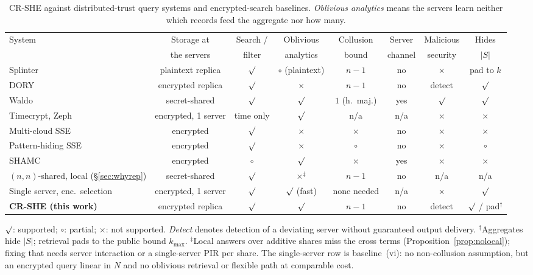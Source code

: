 \documentclass[a4paper,fleqn]{cas-dc}
\providecommand{\checkmark}{\ensuremath{\surd}}
\begin{document}
\begin{table}[pos=t,width=\textwidth]
\caption{CR-SHE against distributed-trust query systems and encrypted-search
baselines. \emph{Oblivious analytics} means the servers learn neither which
records feed the aggregate nor how many.}
\label{tab:compare}
\centering
\scriptsize
\setlength{\tabcolsep}{3pt}
\begin{tabular*}{\tblwidth}{@{\extracolsep{\fill}}lccccccc@{}}
\toprule
System & Storage at & Search / & Oblivious & Collusion & Server & Malicious &
Hides \\
 & the servers & filter & analytics & bound & channel & security & $|S|$ \\
\midrule
Splinter \citep{splinter} & plaintext replica & $\checkmark$ &
$\circ$ (plaintext) & $n-1$ & no & $\times$ & pad to $k$ \\
DORY \citep{dory} & encrypted replica & $\checkmark$ & $\times$ & $n-1$ & no &
detect & $\checkmark$ \\
Waldo \citep{waldo} & secret-shared & $\checkmark$ & $\checkmark$ &
$1$ (h.\ maj.) & yes & $\checkmark$ & $\checkmark$ \\
Timecrypt, Zeph \citep{timecrypt,zeph} & encrypted, 1 server & time only &
$\checkmark$ & n/a & n/a & $\times$ & $\times$ \\
Multi-cloud SSE \citep{xu2021privacy} & encrypted & $\checkmark$ & $\times$ &
$\times$ & no & $\times$ & $\times$ \\
Pattern-hiding SSE \citep{xu2023symmetric} & encrypted & $\checkmark$ &
$\times$ & $\circ$ & no & $\times$ & $\circ$ \\
SHAMC \citep{wang2020shamc} & encrypted & $\circ$ & $\checkmark$ & $\times$ &
yes & $\times$ & $\times$ \\
\midrule
$(n,n)$-shared, local (\S\ref{sec:whyrep}) & secret-shared & $\checkmark$ &
$\times^{\ddagger}$ & $n-1$ & no & n/a & n/a \\
Single server, enc.\ selection & encrypted, 1 server & $\checkmark$ &
$\checkmark$ (fast) & none needed & n/a & $\times$ & $\checkmark$ \\
\textbf{CR-SHE (this work)} & encrypted replica & $\checkmark$ & $\checkmark$ &
$n-1$ & no & detect & $\checkmark$ / pad$^{\dagger}$ \\
\bottomrule
\end{tabular*}
\vspace{3pt}
\begin{flushleft}
\footnotesize
$\checkmark$: supported; $\circ$: partial; $\times$: not supported.
\emph{Detect} denotes detection of a deviating server without guaranteed
output delivery. $^{\dagger}$Aggregates hide $|S|$; retrieval pads to the
public bound $k_{\max}$. $^{\ddagger}$Local answers over additive shares miss
the cross terms (Proposition~\ref{prop:nolocal}); fixing that needs server
interaction or a single-server PIR per share. The single-server row is
baseline~(vi): no non-collusion assumption, but an encrypted query linear in
$N$ and no oblivious retrieval or flexible path at comparable cost.
\end{flushleft}
\end{table}
\end{document}
